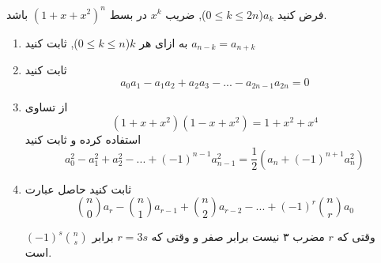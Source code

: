     \p
    فرض کنید $a_k$($0 \leq k \leq 2n$), ضریب $x^k$ در بسط $(1 + x + x^2)^n$ باشد.
	\begin{enumerate}
        \item
    	به ازای هر $k$($0 \leq k \leq n$), ثابت کنید $a_{n-k} = a_{n+k}$
    	\item
    	ثابت کنید
        $$a_0a_1 - a_1a_2 + a_2a_3 - ... - a_{2n-1}a_{2n} = 0$$
    	\item
    	از تساوی
    	$$(1 + x + x^2)(1 - x + x^2) = 1 + x^2 + x^4$$
    	استفاده کرده و ثابت کنید
    	$$a_0^2 - a_1^2 + a_2^2 - ... + (-1)^{n - 1}a_{n - 1}^2 = \frac{1}{2}(a_n + (-1)^{n + 1}a_n^2)$$
    	\item
    	ثابت کنید حاصل عبارت
        $${n \choose 0}a_r - {n \choose 1}a_{r - 1} + {n \choose 2}a_{r - 2} - ... + (-1)^r{n \choose r}a_0$$
        
    	وقتی که $r$ مضرب ۳ نیست برابر صفر و وقتی که $r = 3s$ برابر $(-1)^s{n \choose s}$ است.
	\end{enumerate}
